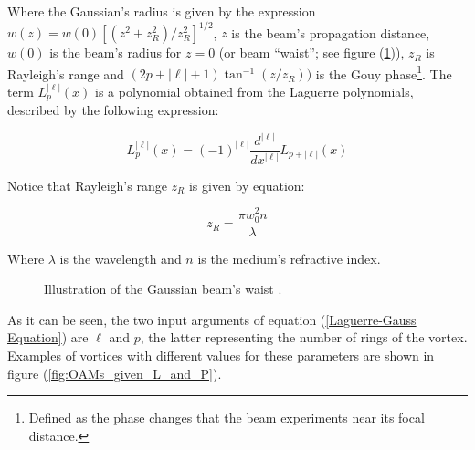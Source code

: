 Where the Gaussian's radius is given by the expression $w(z) = w(0)[(z^2+z^2_R)/z^2_R]^{1/2}$, $z$ is the beam's propagation distance, $w(0)$ is the beam's radius for $z=0$ (or beam ``waist''; see figure (\ref{fig:Gaussian_Beam_Waist})), $z_R$ is Rayleigh's range and $(2p+|\ell|+1)\tan^{-1}{(z/z_R)})$ is the Gouy phase\footnote{Defined as the phase changes that the beam experiments near its focal distance.}. The term $L_p^{|\ell|}(x)$ is a polynomial obtained from the Laguerre polynomials, described by the following expression:

\begin{equation}
    L_p^{|\ell|}(x) = (-1)^{|\ell|}\frac{d^{|\ell|}}{dx^{|\ell|}}L_{p+|\ell|}(x)
\end{equation}

Notice that Rayleigh's range $z_R$ is given by equation:

\begin{equation}
    z_R = \frac{\pi w_0^2n}{\lambda}
\end{equation}

Where $\lambda$ is the wavelength and $n$ is the medium's refractive index.

\begin{figure}[htbp]
    \centering
    \caption{Illustration of the Gaussian beam's waist \cite{GaussianBeamParameters}.}
    \label{fig:Gaussian_Beam_Waist}
\end{figure}

As it can be seen, the two input arguments of equation (\ref{Laguerre-Gauss Equation}) are $\ell$ and $p$, the latter representing the number of rings of the vortex. Examples of vortices with different values for these parameters are shown in figure (\ref{fig:OAMs_given_L_and_P}).


